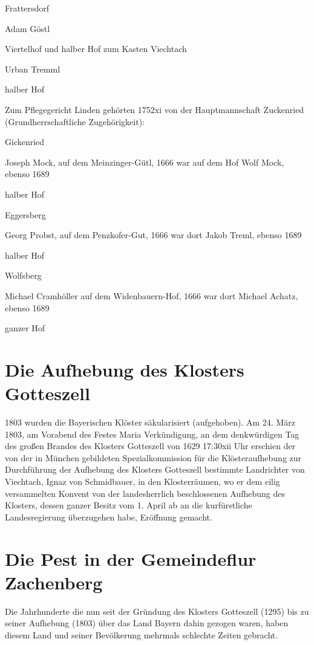 \documentclass[12pt,a4pager]{book}
\begin{document}
Frattersdorf

Adam Göstl

Viertelhof und halber Hof zum Kasten Viechtach



Urban Tremml

halber Hof



Zum Pflegegericht Linden gehörten 1752xi von der Hauptmannschaft Zuckenried
(Grundherrschaftliche Zugehörigkeit):



Gickenried

Joseph Mock, auf dem Meinzinger-Gütl, 1666 war auf dem Hof Wolf Mock, ebenso
1689

halber Hof

Eggersberg

Georg Probst, auf dem Penzkofer-Gut, 1666 war dort Jakob Treml, ebenso 1689

halber Hof

Wolfsberg

Michael Cramhöller auf dem Widenbauern-Hof, 1666 war dort Michael Achatz, ebenso
1689

ganzer Hof

\section{Die Aufhebung des Klosters Gotteszell}

1803 wurden die Bayerischen Klöster säkularisiert (aufgehoben). Am 24. März
1803, am Vorabend des Festes Maria Verkündigung, an dem denkwürdigen Tag des
großen Brandes des Klosters Gotteszell von 1629 17:30xii Uhr erschien der von
der in München gebildeten Spezialkommission für die Klösteraufhebung zur
Durchführung der Aufhebung des Klosters Gotteszell bestimmte Landrichter von
Viechtach, Ignaz von Schmidbauer, in den Klosterräumen, wo er dem eilig
versammelten Konvent von der landesherrlich beschlossenen Aufhebung des
Klosters, dessen ganzer Besitz vom 1. April ab an die kurfürstliche
Landesregierung überzugehen habe, Eröffnung gemacht.

\section{Die Pest in der Gemeindeflur Zachenberg}

Die Jahrhunderte die nun seit der Gründung des Klosters Gotteszell (1295) bis zu
seiner Aufhebung (1803) über das Land Bayern dahin gezogen waren, haben diesem
Land und seiner Bevölkerung mehrmals schlechte Zeiten gebracht.
\end{document}

